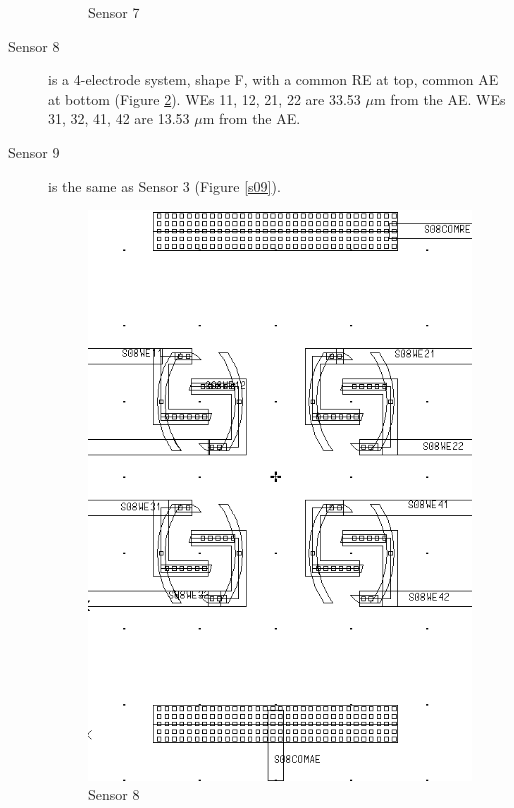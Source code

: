 \begin{description}
\begin{figure}
\begin{minipage}{0.5\linewidth}
		\caption{Sensor 7}
		\label{s07}
	\end{minipage}
\end{figure}

\item[Sensor 8] is a 4-electrode system, shape F, with a common RE at top, common AE at bottom (Figure \ref{s08}). WEs 11, 12, 21, 22 are 33.53 $\mu \mathrm{m}$ from the AE. WEs 31, 32, 41, 42 are 13.53 $\mu \mathrm{m}$ from the AE.
\item[Sensor 9] is the same as Sensor 3 (Figure \ref{s09}).

\begin{figure}
	\begin{minipage}{0.5\linewidth}
		\centering
		\includegraphics[width=0.6\linewidth]{figures/s08.png}
		\caption{Sensor 8}
		\label{s08}
	\end{minipage}
	\begin{minipage}{0.5\linewidth}
		\centering

\end{minipage}
\end{figure}
\end{description}
